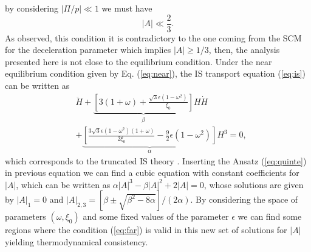 \documentclass[twocolumn,showpacs,nofootinbib,floats,amsmath,amssymb]{revtex4}
\begin{document}
by considering $\left|\Pi / p \right| \ll 1$ we must have
\begin{equation}
\left|A\right| \ll \frac{2}{3}.
\label{eq:far}
\end{equation} 
As observed, this condition it is contradictory to the one coming from the SCM for the deceleration parameter which implies $\left|A\right| \geq 1/3$, then, the analysis presented here is not close to the equilibrium condition. Under the near equilibrium condition given by Eq. (\ref{eq:near}), the IS transport equation (\ref{eq:is}) can be written as
\begin{align}
& \ddot{H}+\underbrace{\left[3(1+\omega)+\frac{\sqrt{3}\epsilon(1-\omega^{2})}{\xi_{0}}\right]}_{\beta}H\dot{H} \nonumber \\ 
& + \underbrace{\left[\frac{3\sqrt{3}\epsilon (1-\omega^{2})(1+\omega)}{2\xi_{0}}-\frac{9}{2}\epsilon (1-\omega^{2})\right]}_{\alpha}H^{3} = 0,
\end{align}
which corresponds to the truncated IS theory \cite{maartens}. Inserting the Ansatz (\ref{eq:quinte}) in previous equation we can find a cubic equation with constant coefficients for $\left|A\right|$, which can be written as $\alpha \left|A\right|^{3}-\beta \left|A\right|^{2}+2\left|A\right| = 0$, whose solutions are given by $\left|A\right|_{1} = 0$ and $\left|A\right|_{2,3} = [\beta \pm \sqrt{\beta^{2}-8\alpha}]/(2\alpha)$. By considering the space of parameters $(\omega, \xi_{0})$ and some fixed values of the parameter $\epsilon$ we can find some regions where the condition (\ref{eq:far}) is valid in this new set of solutions for $\left|A\right|$ yielding thermodynamical consistency.\\
 
\end{document}
